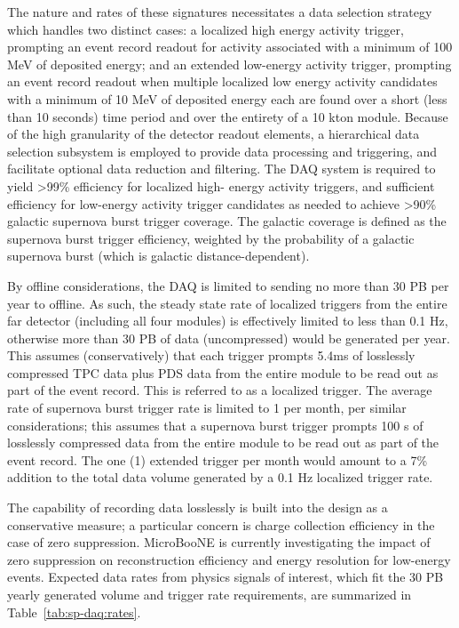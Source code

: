 The nature and rates of these signatures necessitates a data selection strategy which handles two
distinct cases: a localized high energy activity trigger, prompting an event record readout for
activity associated with a minimum of 100 MeV of deposited energy; and an extended
low-energy activity trigger, prompting an event record readout when
multiple localized low energy activity candidates with a minimum of
10 MeV of deposited energy each are found over a short (less than 10
seconds) time period and over the entirety of a 10 kton
module. Because of the high granularity of the detector readout elements, a
hierarchical data selection subsystem is employed to provide data processing and
triggering, and facilitate optional data reduction and filtering. The
DAQ  
system is required to yield >99\% efficiency for localized high-
energy activity triggers, and sufficient efficiency for low-energy
activity trigger candidates as needed to achieve >90\% galactic
supernova burst trigger coverage. The galactic coverage is defined as
the supernova burst trigger efficiency, weighted by the probability of
a galactic supernova burst (which is galactic distance-dependent).

By offline considerations, the DAQ is limited to sending no more than
30 PB per year to offline. As such, the steady state rate of localized triggers
from the entire far detector (including all four modules) is
effectively limited to less than 0.1 Hz, otherwise
more than 30 PB of data (uncompressed) would be generated per
year. This assumes (conservatively) that each
trigger prompts 5.4\si{\milli\second} of losslessly compressed TPC data plus PDS data from
the entire module to be read out as part of the event record. This is
referred to as a localized trigger. The average rate
of supernova burst trigger rate is limited to 1 per month, per similar
considerations; this assumes that a supernova burst trigger prompts 100 s of losslessly
compressed data from the entire module to be read out as part of the
event record. The one (1) extended trigger per month would amount to a
7\% addition to the total data volume generated by a 0.1 Hz localized
trigger rate.

The capability of recording data losslessly is built
into the design as a conservative measure; a particular concern is
charge collection efficiency in the case of zero
suppression. MicroBooNE is currently investigating the impact of zero
suppression on reconstruction efficiency and energy resolution for
low-energy events. Expected
data rates from physics signals of interest, which fit the 30 PB
yearly generated volume and
trigger rate requirements, are summarized in Table~\ref{tab:sp-daq:rates}.

